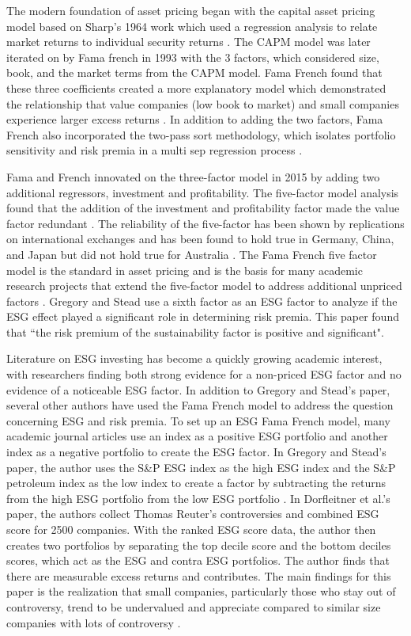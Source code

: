 The modern foundation of asset pricing began with the capital asset pricing model based on Sharp's 1964 work which used a regression analysis to relate market returns to individual security returns \cite{Sharpe1964CAPITALAP}. The CAPM model was later iterated on by Fama french in 1993 with the 3 factors, which considered size,  book, and the market terms from the CAPM model. Fama French found that these three coefficients created a more explanatory model which demonstrated the relationship that value companies (low book to market) and small companies experience larger excess returns \cite{Fama1992TheCO}. In addition to adding the two factors, Fama French also incorporated the two-pass sort methodology, which isolates portfolio sensitivity and risk premia in a multi sep regression process \cite{Kleibergen2013UnexplainedFA, Fama1973RiskRA}.

Fama and French innovated on the three-factor model in 2015 by adding two additional regressors, investment and profitability. The five-factor model analysis found that the addition of the investment and profitability factor made the value factor redundant \cite{Fama2013AFA}. The reliability of the five-factor has been shown by replications on international exchanges and has been found to hold true in Germany, China, and Japan but did not hold true for Australia \cite{Fama2015InternationalTO, LIN2017141, Chiah2016A}. The Fama French five factor model is the standard in asset pricing and is the basis for many academic research projects that extend the five-factor model to address additional unpriced factors \cite{Dirkx2020TheFF}. Gregory and Stead use a sixth factor as an ESG factor to analyze if the ESG effect played a significant role in determining risk premia. This paper found that  ``the risk premium of the sustainability factor is positive and significant"\cite{Gregory2020TheGP}.


Literature on ESG investing has become a quickly growing academic interest, with researchers finding both strong evidence for a non-priced ESG factor and no evidence of a noticeable ESG factor. In addition to Gregory and Stead's paper, several other authors have used the Fama French model to address the question concerning ESG and risk premia. To set up an ESG Fama French model, many academic journal articles use an index as a positive ESG portfolio and another index as a negative portfolio to create the ESG factor. In Gregory and Stead's paper, the author uses the S\&P ESG index as the high ESG index and the S\&P petroleum index as the low index to create a factor by subtracting the returns from the high ESG portfolio from the low ESG portfolio \cite{Gregory2020TheGP}. In Dorfleitner et al.'s paper, the authors collect Thomas Reuter's controversies and combined ESG score for 2500 companies. With the ranked ESG score data, the author then creates two portfolios by separating the top decile score and the bottom deciles scores, which act as the ESG and contra ESG portfolios. The author finds that there are measurable excess returns and contributes. The main findings for this paper is the realization that small companies, particularly those who stay out of controversy, trend to be undervalued and appreciate compared to similar size companies with lots of controversy \cite{Dorfleitner2020ESGCA}.

